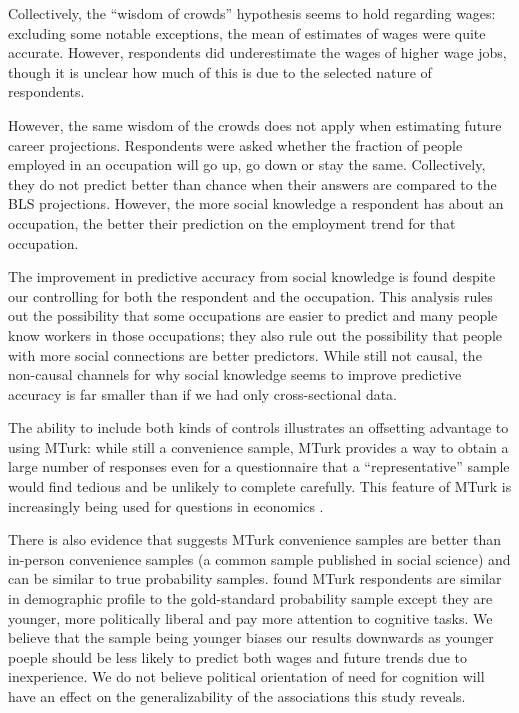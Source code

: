 \documentclass[12pt]{article}
\begin{document}
Collectively, the ``wisdom of crowds'' hypothesis seems to hold regarding wages: 
excluding some notable exceptions, the mean of estimates of wages were quite accurate. 
However, respondents did underestimate the wages of higher wage jobs, though it is unclear how much of this is due to the selected nature of respondents. 

However, the same wisdom of the crowds does not apply when estimating future career projections.
Respondents were asked whether the fraction of people employed in an occupation will go up, go down or stay the same. 
Collectively, they do not predict better than chance when their answers are compared to the BLS projections. 
However, the more social knowledge a respondent has about an occupation, the better their prediction on the employment trend for that occupation. %

The improvement in predictive accuracy from social knowledge is found despite our controlling for both the respondent and the occupation.
This analysis rules out the possibility that some occupations are easier to predict and many people know workers in those occupations; 
they also rule out the possibility that people with more social connections are better predictors.
While still not causal, the non-causal channels for why social knowledge seems to improve predictive accuracy is far smaller than if we had only cross-sectional data. %


The ability to include both kinds of controls illustrates an offsetting advantage to using MTurk: 
while still a convenience sample, MTurk provides a way to obtain a large number of responses even for a questionnaire that a ``representative'' sample would find tedious and be unlikely to complete carefully.
This feature of MTurk is increasingly being used for questions in economics  \citep{kuziemko2013elastic, saez2013generalized}. 

There is also evidence that suggests MTurk convenience samples are better than in-person convenience samples (a common sample published in social science) and can be similar to true probability samples. \citet{Berinsky2012} found MTurk respondents are similar in demographic profile to the gold-standard probability sample except they are younger, more politically liberal and pay more attention to cognitive tasks. We believe that the sample being younger biases our results downwards as younger poeple should be less likely to predict both wages and future trends due to inexperience. We do not believe political orientation of need for cognition will have an effect on the generalizability of the associations this study reveals.
\end{document}
